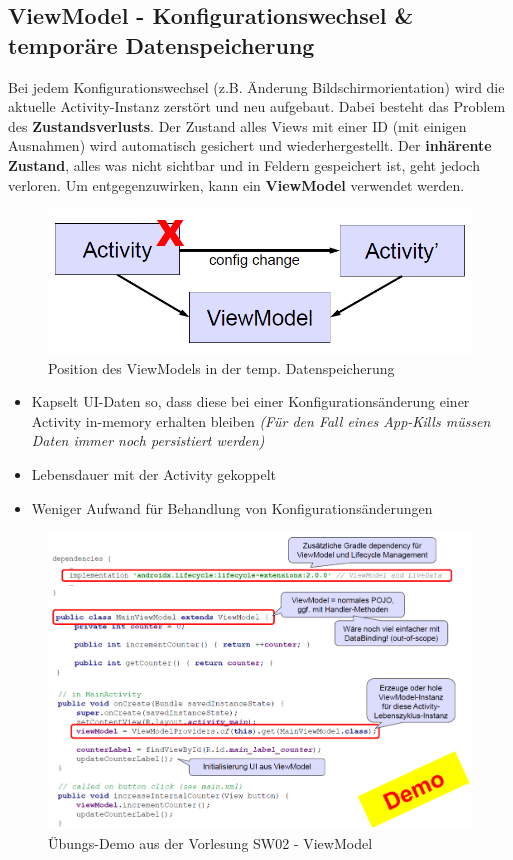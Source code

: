 \documentclass[a4paper]{article}
\begin{document}
\newpage

\subsection{ViewModel - Konfigurationswechsel \& temporäre Datenspeicherung}

Bei jedem Konfigurationswechsel (z.B. Änderung Bildschirmorientation) wird die aktuelle Activity-Instanz zerstört und neu aufgebaut. Dabei besteht das Problem des \textbf{Zustandsverlusts}. Der Zustand alles Views mit einer ID (mit einigen Ausnahmen) wird automatisch gesichert und wiederhergestellt. Der \textbf{inhärente Zustand}, alles was nicht sichtbar und in Feldern gespeichert ist, geht jedoch verloren. Um entgegenzuwirken, kann ein \textbf{ViewModel} verwendet werden.

\begin{figure}[htb!]
	\centering
	\includegraphics[width=.6\textwidth]{img/viewmodel}
	\caption{Position des ViewModels in der temp. Datenspeicherung}
\end{figure}

\begin{itemize}
	\item Kapselt UI-Daten so, dass diese bei einer Konfigurationsänderung einer Activity in-memory erhalten bleiben \textit{(Für den Fall eines App-Kills müssen Daten immer noch persistiert werden)}
	\item Lebensdauer mit der Activity gekoppelt
	\item Weniger Aufwand für Behandlung von Konfigurationsänderungen
\end{itemize}

\begin{figure}[htb!]
	\centering
	\includegraphics[width=\textwidth]{img/viewmodel_demo.png}
	\caption{Übungs-Demo aus der Vorlesung SW02 - ViewModel}
\end{figure}
\end{document}
